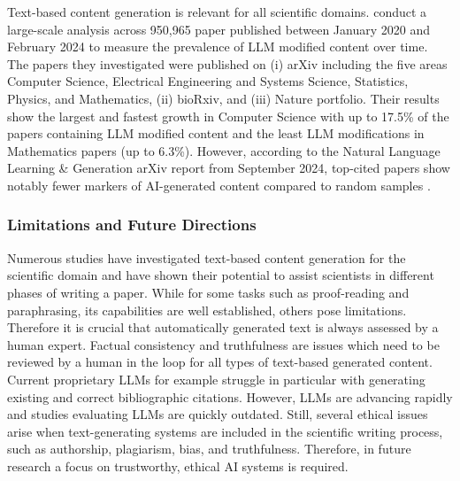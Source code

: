 Text-based content generation is relevant for all scientific domains. \citet{liang2024mapping} conduct a large-scale analysis across 950,965 paper published between January 2020 and February 2024 to measure the prevalence of LLM modified content over time. The papers they investigated were published on (i) arXiv including the five areas Computer Science, Electrical Engineering and Systems Science, Statistics, Physics, and Mathematics, (ii) bioRxiv, and (iii) Nature portfolio. Their results show the largest and fastest growth in Computer Science with up to 17.5\% of the papers containing LLM modified content %
and the least LLM modifications in Mathematics papers (up to 6.3\%). However, according to the Natural Language Learning \& Generation arXiv report from September 2024, top-cited papers show notably fewer markers of AI-generated content compared to random samples \cite{Leiter2024NLLGQA}.

\subsubsection{Limitations and Future Directions}


Numerous studies have investigated text-based content generation for the scientific domain and have shown their potential to assist scientists in different phases of writing a paper. While for some tasks such as proof-reading and paraphrasing, its capabilities are well established, others pose limitations. Therefore it is crucial that automatically generated text is always assessed by a human expert. Factual consistency and truthfulness are issues which need to be reviewed by a human in the loop %
for all types of text-based generated content. Current proprietary LLMs for example struggle in particular with generating existing and correct bibliographic citations. However, LLMs are advancing rapidly and studies evaluating LLMs are quickly outdated. Still, several ethical issues arise when text-generating systems are included in the scientific writing process, such as authorship, plagiarism, bias, and truthfulness. Therefore, in future research a focus on trustworthy, ethical AI systems is required. 



